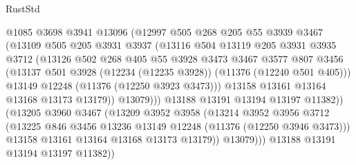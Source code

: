 \begin{lexlean}{RustStd}
\begin{coremodule}
{{{{{{{{{{{{{{{{{{{                        @1085
                        @3698
                        @3941
                        @13096
                        (@12997
                          @505
                          @268
                          @205
                          @55
                          @3939
                          @3467
                          (@13109
                            @505
                            @205
                            @3931
                            @3937
                            (@13116
                              @504
                              @13119
                              @205
                              @3931
                              @3935
                              @3712
                              (@13126
                                @502
                                @268
                                @405
                                @55
                                @3928
                                @3473
                                @3467
                                @3577
                                @807
                                @3456
                                (@13137
                                  @501
                                  @3928
                                  (@12234 (@12235 @3928))
                                  (@11376 (@12240 @501 @405)))
                                @13149
                                @12248
                                (@11376 (@12250 @3923 @3473)))
                              @13158
                              @13161
                              @13164
                              @13168
                              @13173
                              @13179))
                          @13079)))
                    @13188
                    @13191
                    @13194
                    @13197
                    @11382))
                (@13205
                  @3960
                  @3467
                  (@13209
                    @3952
                    @3958
                    (@13214
                      @3952
                      @3956
                      @3712
                      (@13225 @846 @3456 @13236 @13149 @12248 (@11376 (@12250 @3946 @3473)))
                      @13158
                      @13161
                      @13164
                      @13168
                      @13173
                      @13179))
                  @13079)))
            @13188
            @13191
            @13194
            @13197
            @11382))
}}}}}}}}}}}}}}}}}}}
\end{coremodule}
\end{lexlean}
